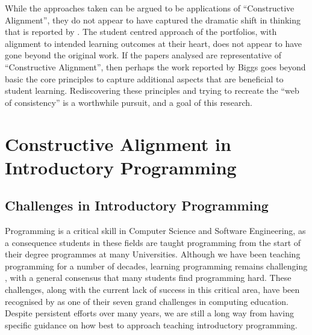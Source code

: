 While the approaches taken can be argued to be applications of ``Constructive Alignment'', they do not appear to have captured the dramatic shift in thinking that is reported by \citet{Biggs:1996c}. The student centred approach of the portfolios, with alignment to intended learning outcomes at their heart, does not appear to have gone beyond the original work. If the papers analysed are representative of ``Constructive Alignment'', then perhaps the work reported by Biggs goes beyond basic the core principles to capture additional aspects that are beneficial to student learning. Rediscovering these principles and trying to recreate the ``web of consistency'' is a worthwhile pursuit, and a goal of this research.




\clearpage
\section{Constructive Alignment in Introductory Programming} %
\label{sec:constructive_alignment_in_introductory_programming}

\subsection{Challenges in Introductory Programming} %
\label{sub:challenges_in_introductory_programming}

Programming is a critical skill in Computer Science and Software Engineering, as a consequence students in these fields are taught programming from the start of their degree programmes at many Universities. Although we have been teaching programming for a number of decades, learning programming remains challenging \cite{Jenkins:2002,Lahtinen:2005,Lister:2004,McCracken:2001,Ragonis:2007,Robins:2003,Rountree:2002,Renumol:2010,Wiedenbeck:2005}, with a general consensus that many students find programming hard. These challenges, along with the current lack of success in this critical area, have been recognised by \citet{McGettrick:2005} as one of their seven grand challenges in computing education. Despite persistent efforts over many years, we are still a long way from having specific guidance on how best to approach teaching introductory programming.

